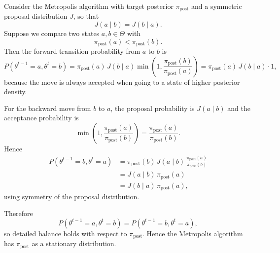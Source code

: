 \documentclass[11pt, titlepage]{article} %
\numberwithin{equation}{section}
\theoremstyle{definition}
\numberwithin{assumption}{section}
\begin{document}
Consider the Metropolis algorithm with target posterior $\pi_{\mathrm{post}}$ and a symmetric proposal distribution $J$, so that
\begin{equation*}
    J(a\mid b)=J(b\mid a).
\end{equation*}
Suppose we compare two states $a,b\in \Theta$ with
\begin{equation*}
    \pi_{\mathrm{post}}(a)<\pi_{\mathrm{post}}(b).
\end{equation*}
Then the forward transition probability from $a$ to $b$ is
\begin{equation*}
    P(\theta^{t-1}=a,\theta^t=b)
    =\pi_{\mathrm{post}}(a)\,J(b\mid a)
    \min\!\left(1,\frac{\pi_{\mathrm{post}}(b)}{\pi_{\mathrm{post}}(a)}\right)
    =\pi_{\mathrm{post}}(a)\,J(b\mid a)\cdot 1 
    ,
\end{equation*}
because the move is always accepted when going to a state of higher posterior density.

For the backward move from $b$ to $a$, the proposal probability is $J(a\mid b)$ and the acceptance probability is
\begin{equation*}
    \min\!\left(1,\frac{\pi_{\mathrm{post}}(a)}{\pi_{\mathrm{post}}(b)}\right)
    =
    \frac{\pi_{\mathrm{post}}(a)}{\pi_{\mathrm{post}}(b)}.
\end{equation*}
Hence
\begin{align*}
    P(\theta^{t-1}=b,\theta^t=a)
    &=
    \pi_{\mathrm{post}}(b)\,J(a\mid b)\,
    \frac{\pi_{\mathrm{post}}(a)}{\pi_{\mathrm{post}}(b)}\\
    &=
    J(a\mid b)\,\pi_{\mathrm{post}}(a)\\
    &=
    J(b\mid a)\,\pi_{\mathrm{post}}(a),
\end{align*}
using symmetry of the proposal distribution.

Therefore
\begin{equation*}
    P(\theta^{t-1}=a,\theta^t=b)
    =
    P(\theta^{t-1}=b,\theta^t=a),
\end{equation*}
so detailed balance holds with respect to $\pi_{\mathrm{post}}$. Hence the Metropolis algorithm has $\pi_{\mathrm{post}}$ as a stationary distribution.
\end{document}
